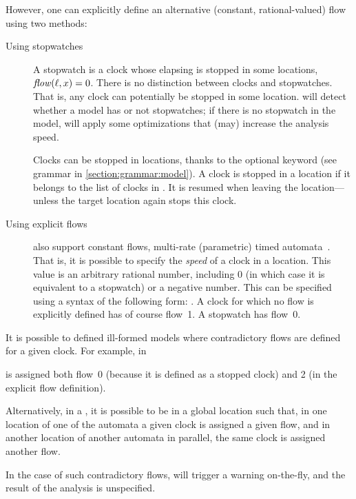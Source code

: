 However, one can explicitly define an alternative (constant, rational-valued) flow using two methods:
\begin{description}
	\item [Using stopwatches]
A stopwatch is a clock whose elapsing is stopped in some locations, \ie{} $\mathit{flow}(\ell, x) = 0$.
There is no distinction between clocks and stopwatches.
That is, any clock can potentially be stopped in some location.
\imitator{} will detect whether a model has or not stopwatches; if there is no stopwatch in the model, \imitator{} will apply some optimizations that (may) increase the analysis speed.

Clocks can be stopped in locations, thanks to the optional  keyword (see grammar in  \cref{section:grammar:model}).
A clock is stopped in a location if it belongs to the list of clocks in .
It is resumed when leaving the location---unless the target location again stops this clock.

\item [Using explicit flows]
\imitator{} also support constant flows, \ie{} multi-rate (parametric) timed automata~\cite{ACHHHNOSY95}.
That is, it is possible to specify the \emph{speed} of a clock in a location.
This value is an arbitrary rational number, including 0 (in which case it is equivalent to a stopwatch) or a negative number.
This can be specified using a syntax of the following form: .
A clock for which no flow is explicitly defined has of course flow~1.
A stopwatch has flow~0.
\end{description}



\begin{remark}
	It is possible to defined ill-formed models where contradictory flows are defined for a given clock.
	For example, in
	
	
	\noindent
	 is assigned both flow~0 (because it is defined as a stopped clock) and 2 (in the explicit flow definition).
	
	Alternatively, in a \NIPTA{}, it is possible to be in a global location such that, in one location of one of the automata a given clock is assigned a given flow, and in another location of another automata in parallel, the same clock is assigned another flow.
	
	In the case of such contradictory flows, \imitator{} will trigger a warning on-the-fly, and the result of the analysis is unspecified.
\end{remark}



